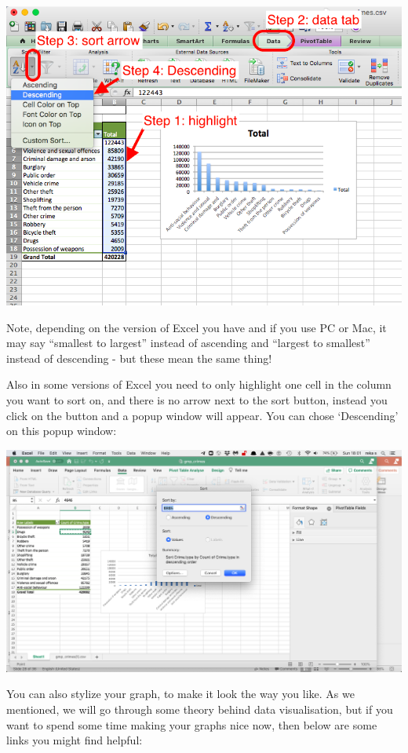 \documentclass[
]{book}
\begin{document}
\includegraphics{imgs/sort_graph.png}

Note, depending on the version of Excel you have and if you use PC or Mac, it may say ``smallest to largest'' instead of ascending and ``largest to smallest'' instead of descending - but these mean the same thing!

Also in some versions of Excel you need to only highlight one cell in the column you want to sort on, and there is no arrow next to the sort button, instead you click on the button and a popup window will appear. You can chose `Descending' on this popup window:

\includegraphics{imgs/sort_graph_newvs.png}

You can also stylize your graph, to make it look the way you like. As we mentioned, we will go through some theory behind data visualisation, but if you want to spend some time making your graphs nice now, then below are some links you might find helpful:
\end{document}

